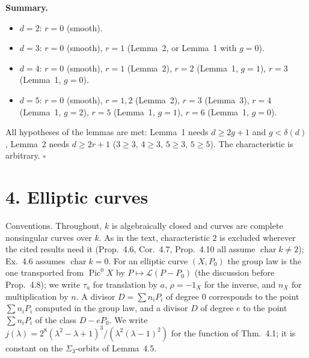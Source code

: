 \documentclass[11pt]{article}
\begin{document}
\textbf{Summary.}
\begin{itemize}
\item $d=2$: $r=0$ (smooth).
\item $d=3$: $r=0$ (smooth), $r=1$ (Lemma~2, or Lemma~1 with $g=0$).
\item $d=4$: $r=0$ (smooth), $r=1$ (Lemma~2), $r=2$ (Lemma~1, $g=1$), $r=3$ (Lemma~1, $g=0$).
\item $d=5$: $r=0$ (smooth), $r=1,2$ (Lemma~2), $r=3$ (Lemma~3), $r=4$ (Lemma~1, $g=2$), $r=5$ (Lemma~1, $g=1$), $r=6$ (Lemma~1, $g=0$).
\end{itemize}
All hypotheses of the lemmas are met: Lemma~1 needs $d\ge2g+1$ and $g<\delta(d)$, Lemma~2 needs $d\ge2r+1$ ($3\ge3$, $4\ge3$, $5\ge3$, $5\ge5$). The characteristic is arbitrary. \hfill$\square$

\section*{4. Elliptic curves}

Conventions. Throughout, $k$ is algebraically closed and curves are complete nonsingular curves over $k$. As in the text, characteristic $2$ is excluded wherever the cited results need it (Prop.~4.6, Cor.~4.7, Prop.~4.10 all assume $\operatorname{char}k\ne2$); Ex.~4.6 assumes $\operatorname{char}k=0$. For an elliptic curve $(X,P_0)$ the group law is the one transported from $\operatorname{Pic}^0X$ by $P\mapsto\mathcal L(P-P_0)$ (the discussion before Prop.~4.8); we write $\tau_a$ for translation by $a$, $\rho=-1_X$ for the inverse, and $n_X$ for multiplication by $n$. A divisor $D=\sum n_iP_i$ of degree $0$ corresponds to the point $\sum n_iP_i$ computed in the group law, and a divisor $D$ of degree $e$ to the point $\sum n_iP_i$ of the class $D-eP_0$. We write $j(\lambda)=2^8(\lambda^2-\lambda+1)^3/(\lambda^2(\lambda-1)^2)$ for the function of Thm.~4.1; it is constant on the $\Sigma_3$-orbits of Lemma~4.5.
\end{document}
